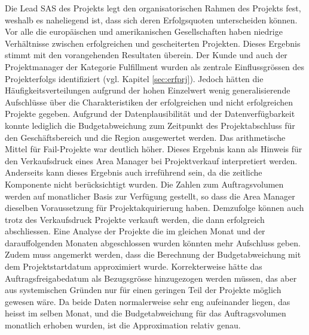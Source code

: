 \newline Die Lead SAS des Projekts legt den organisatorischen Rahmen des Projekts fest, weshalb es naheliegend ist, dass sich deren Erfolgsquoten unterscheiden können. Vor alle die europäischen und amerikanischen Gesellschaften haben niedrige Verhältnisse zwischen erfolgreichen und gescheiterten Projekten. Dieses Ergebnis stimmt mit den vorangehenden Resultaten überein.
\newline
Der Kunde und auch der Projektmanager der Kategorie Fulfillment wurden als zentrale Einflussgrössen des Projekterfolgs identifiziert (vgl. Kapitel \ref{sec:erfprj}). Jedoch hätten die Häufigkeitsverteilungen aufgrund der hohen Einzelwert  wenig generalisierende Aufschlüsse über die Charakteristiken der erfolgreichen und nicht erfolgreichen Projekte gegeben.
\newline\newline
Aufgrund der Datenplausibilität und der Datenverfügbarkeit konnte lediglich die Budgetabweichung zum Zeitpunkt des Projektabschluss für den Geschäftsbereich und die Region ausgewertet werden. Das arithmetische Mittel für Fail-Projekte war deutlich höher. Dieses Ergebnis kann als Hinweis für den Verkaufsdruck eines Area Manager bei Projektverkauf interpretiert werden. Anderseits kann dieses Ergebnis auch irreführend sein, da die zeitliche Komponente nicht berücksichtigt wurden. Die Zahlen zum Auftragsvolumen werden auf monatlicher Basis zur Verfügung gestellt, so dass die Area Manager dieselben Voraussetzung für Projektakquirierung haben. Demzufolge können auch trotz des Verkaufsdruck Projekte verkauft werden, die dann erfolgreich abschliessen. Eine Analyse der Projekte die im gleichen Monat und der darauffolgenden Monaten abgeschlossen wurden könnten mehr Aufschluss geben. Zudem muss angemerkt werden, dass die Berechnung der Budgetabweichung mit dem Projektstartdatum approximiert wurde. Korrekterweise hätte das Auftragsfreigabedatum als Bezugsgrösse hinzugezogen werden müssen, das aber aus systemischen Gründen nur für einen geringen Teil der Projekte möglich gewesen wäre. Da beide Daten normalerweise sehr eng aufeinander liegen, das heisst im selben Monat, und die Budgetabweichung für das Auftragsvolumen monatlich erhoben wurden, ist die Approximation relativ genau.
\newline\newline
